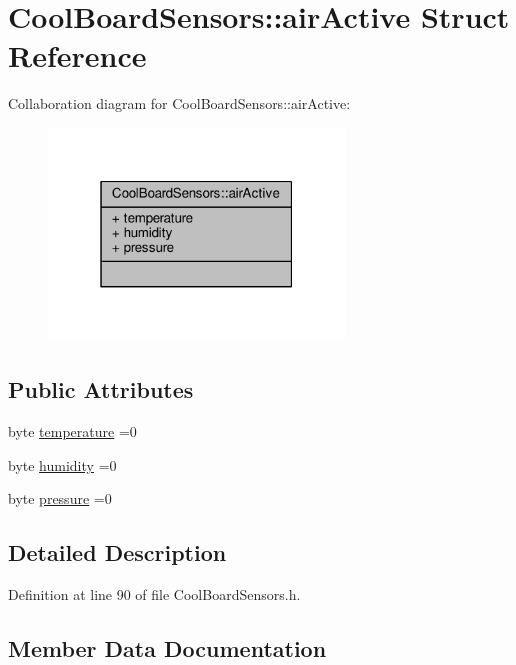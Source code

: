 \hypertarget{structCoolBoardSensors_1_1airActive}{}\section{Cool\+Board\+Sensors\+:\+:air\+Active Struct Reference}
\label{structCoolBoardSensors_1_1airActive}


Collaboration diagram for Cool\+Board\+Sensors\+:\+:air\+Active\+:\nopagebreak
\begin{figure}[H]
\begin{center}
\leavevmode
\includegraphics[width=223pt]{structCoolBoardSensors_1_1airActive__coll__graph}
\end{center}
\end{figure}
\subsection*{Public Attributes}
\begin{DoxyCompactItemize}
\item 
byte \hyperlink{structCoolBoardSensors_1_1airActive_a9a6633c426b0508e30ebc1832ec6d745}{temperature} =0
\item 
byte \hyperlink{structCoolBoardSensors_1_1airActive_ae5740445054b27415e22f450576accb7}{humidity} =0
\item 
byte \hyperlink{structCoolBoardSensors_1_1airActive_ab200826a70d1dc9945f5efb6b9c732ed}{pressure} =0
\end{DoxyCompactItemize}


\subsection{Detailed Description}


Definition at line 90 of file Cool\+Board\+Sensors.\+h.



\subsection{Member Data Documentation}
\mbox{\label{structCoolBoardSensors_1_1airActive_ae5740445054b27415e22f450576accb7}} 
